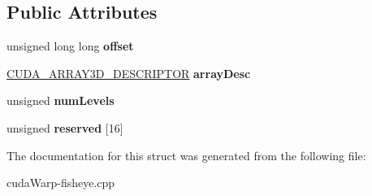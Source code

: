 \subsection*{Public Attributes}
\begin{DoxyCompactItemize}
\item 
unsigned long long {\bfseries offset}\hypertarget{structCUDA__EXTERNAL__MEMORY__MIPMAPPED__ARRAY__DESC__st_aba261fda0de983c6aadd58472f3170e4}{}\label{structCUDA__EXTERNAL__MEMORY__MIPMAPPED__ARRAY__DESC__st_aba261fda0de983c6aadd58472f3170e4}

\item 
\hyperlink{structCUDA__ARRAY3D__DESCRIPTOR__st}{C\+U\+D\+A\+\_\+\+A\+R\+R\+A\+Y3\+D\+\_\+\+D\+E\+S\+C\+R\+I\+P\+T\+OR} {\bfseries array\+Desc}\hypertarget{structCUDA__EXTERNAL__MEMORY__MIPMAPPED__ARRAY__DESC__st_acd05ae113303afc7cef492a15cf22541}{}\label{structCUDA__EXTERNAL__MEMORY__MIPMAPPED__ARRAY__DESC__st_acd05ae113303afc7cef492a15cf22541}

\item 
unsigned {\bfseries num\+Levels}\hypertarget{structCUDA__EXTERNAL__MEMORY__MIPMAPPED__ARRAY__DESC__st_a82cd541f8884231f9dc2fdae195255f8}{}\label{structCUDA__EXTERNAL__MEMORY__MIPMAPPED__ARRAY__DESC__st_a82cd541f8884231f9dc2fdae195255f8}

\item 
unsigned {\bfseries reserved} \mbox{[}16\mbox{]}\hypertarget{structCUDA__EXTERNAL__MEMORY__MIPMAPPED__ARRAY__DESC__st_ac62c6addc8078568a93fb5792e8819c8}{}\label{structCUDA__EXTERNAL__MEMORY__MIPMAPPED__ARRAY__DESC__st_ac62c6addc8078568a93fb5792e8819c8}

\end{DoxyCompactItemize}


The documentation for this struct was generated from the following file\+:\begin{DoxyCompactItemize}
\item 
cuda\+Warp-\/fisheye.\+cpp\end{DoxyCompactItemize}
